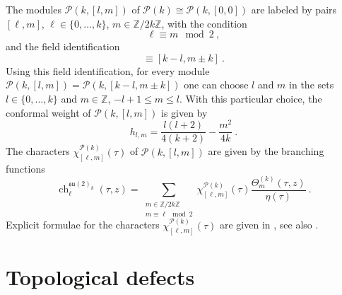 \documentclass[11pt,reqno]{article}
\newcommand{\be}{\begin{equation}}
\newcommand{\ee}{\end{equation}}
\newcommand{\ZZ}{\mathbb{Z}}
\newcommand{\paraf}{\mathcal{P}}
\newcommand{\kmalg}[1]{\mathfrak{#1}}
\newcommand{\alg}[1]{\mathfrak{#1}}
\DeclareMathOperator{\ch}{ch}
\begin{document}
\begin{itemize}
%	
	The modules $\paraf(k,[l,m])$ of $\paraf(k)\cong \paraf(k,[0,0])$ are labeled by pairs $[\ell,m]$, $\ell\in \{0,\ldots,k\}$, $m\in \ZZ/2k\ZZ$, with the condition
	\be \ell\equiv m\mod 2\ ,
	\ee and the field identification
	\be [\ell,m]\equiv [k-l,m\pm k]\ .
	\ee Using this field identification, for every module $\paraf(k,[l,m])=\paraf(k,[k-l,m\pm k])$ one can choose $l$ and $m$ in the sets $l\in \{0,\ldots,k\}$ and $m\in \ZZ$, $-l+1\le m\le l$. With this particular choice, the conformal weight of $\paraf(k,[l,m])$ is given by
	\be h_{l,m}=\frac{l(l+2)}{4(k+2)}-\frac{m^2}{4k}\ .
	\ee
	The characters $\chi^{\paraf(k)}_{[\ell,m]}(\tau)$ of $\paraf(k,[l,m])$ are given by the branching functions
	\be \ch_\ell^{\alg{su}(2)_k}(\tau,z)=\sum_{\substack{m\in \ZZ/2k\ZZ\\ m\equiv \ell\mod 2}} \chi_{[\ell,m]}^{\paraf(k)}(\tau)\frac{\Theta^{(k)}_m(\tau,z)}{\eta(\tau)}\ .
	\ee Explicit formulae for the characters $\chi_{[\ell,m]}^{\paraf(k)}(\tau)$ are given in \cite{Fortin:2006dn}, see also \cite{Haghighat:2023sax}.
\end{itemize}






%


\section{Topological defects}
\end{document}
